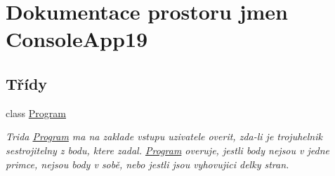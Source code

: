 \hypertarget{namespace_console_app19}{}\section{Dokumentace prostoru jmen Console\+App19}
\label{namespace_console_app19}
\subsection*{Třídy}
\begin{DoxyCompactItemize}
\item 
class \hyperlink{class_console_app19_1_1_program}{Program}
\begin{DoxyCompactList}\small\item\em Trida \hyperlink{class_console_app19_1_1_program}{Program} ma na zaklade vstupu uzivatele overit, zda-\/li je trojuhelnik sestrojitelny z bodu, ktere zadal. \hyperlink{class_console_app19_1_1_program}{Program} overuje, jestli body nejsou v jedne primce, nejsou body v sobě, nebo jestli jsou vyhovujici delky stran. \end{DoxyCompactList}\end{DoxyCompactItemize}
